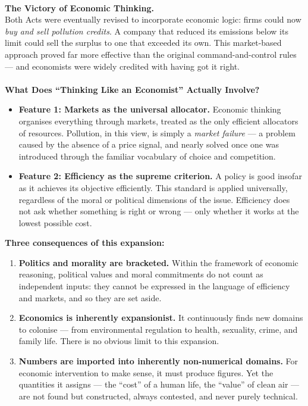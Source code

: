 \documentclass[a4paper,12pt]{article}
\begin{document}
\\
\noindent \textbf{The Victory of Economic Thinking.} \\
\noindent Both Acts were eventually revised to incorporate economic logic: firms could now \emph{buy and sell pollution credits}. A company that reduced its emissions below its limit could sell the surplus to one that exceeded its own. This market-based approach proved far more effective than the original command-and-control rules --- and economists were widely credited with having got it right. \\
\\
\noindent \textbf{What Does ``Thinking Like an Economist'' Actually Involve?}
\begin{itemize}
	\item \textbf{Feature 1: Markets as the universal allocator.} Economic thinking organises everything through markets, treated as the only efficient allocators of resources. Pollution, in this view, is simply a \emph{market failure} --- a problem caused by the absence of a price signal, and nearly solved once one was introduced through the familiar vocabulary of choice and competition.
	\item \textbf{Feature 2: Efficiency as the supreme criterion.} A policy is good insofar as it achieves its objective efficiently. This standard is applied universally, regardless of the moral or political dimensions of the issue. Efficiency does not ask whether something is right or wrong --- only whether it works at the lowest possible cost.
\end{itemize}
\noindent \textbf{Three consequences of this expansion:}
\begin{enumerate}
	\item \textbf{Politics and morality are bracketed.} Within the framework of economic reasoning, political values and moral commitments do not count as independent inputs: they cannot be expressed in the language of efficiency and markets, and so they are set aside.
	\item \textbf{Economics is inherently expansionist.} It continuously finds new domains to colonise --- from environmental regulation to health, sexuality, crime, and family life. There is no obvious limit to this expansion.
	\item \textbf{Numbers are imported into inherently non-numerical domains.} For economic intervention to make sense, it must produce figures. Yet the quantities it assigns --- the ``cost'' of a human life, the ``value'' of clean air --- are not found but constructed, always contested, and never purely technical.
\end{enumerate}
\end{document}
